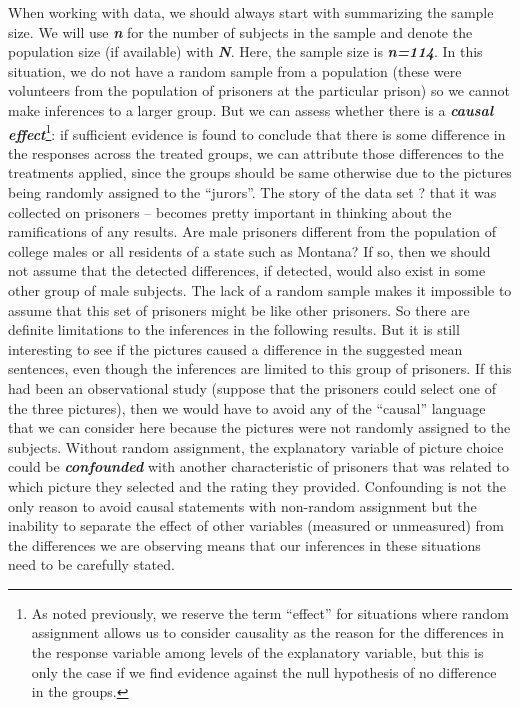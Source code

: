 \documentclass[]{book}
\let\rmarkdownfootnote\footnote%
\def\footnote{\protect\rmarkdownfootnote}
\begin{document}
When working with data, we should always start with summarizing the
sample size. We will use \textbf{\emph{n}} for the number of subjects in
the sample and denote the population size (if available) with
\textbf{\emph{N}}. Here, the sample size is \textbf{\emph{n=114}}. In
this situation, we do not have a random sample from a population (these
were volunteers from the population of prisoners at the particular
prison) so we cannot make inferences to a larger group. But we can
assess whether there is a \textbf{\emph{causal effect}}\footnote{As
  noted previously, we reserve the term ``effect'' for situations where
  random assignment allows us to consider causality as the reason for
  the differences in the response variable among levels of the
  explanatory variable, but this is only the case if we find evidence
  against the null hypothesis of no difference in the groups.}: if
sufficient evidence is found to conclude that there is some difference
in the responses across the treated groups, we can attribute those
differences to the treatments applied, since the groups should be same
otherwise due to the pictures being randomly assigned to the ``jurors''.
The story of the data set ? that it was collected on prisoners --
becomes pretty important in thinking about the ramifications of any
results. Are male prisoners different from the population of college
males or all residents of a state such as Montana? If so, then we should
not assume that the detected differences, if detected, would also exist
in some other group of male subjects. The lack of a random sample makes
it impossible to assume that this set of prisoners might be like other
prisoners. So there are definite limitations to the inferences in the
following results. But it is still interesting to see if the pictures
caused a difference in the suggested mean sentences, even though the
inferences are limited to this group of prisoners. If this had been an
observational study (suppose that the prisoners could select one of the
three pictures), then we would have to avoid any of the ``causal''
language that we can consider here because the pictures were not
randomly assigned to the subjects. Without random assignment, the
explanatory variable of picture choice could be
\textbf{\emph{confounded}} with another characteristic of prisoners that
was related to which picture they selected and the rating they provided.
Confounding is not the only reason to avoid causal statements with
non-random assignment but the inability to separate the effect of other
variables (measured or unmeasured) from the differences we are observing
means that our inferences in these situations need to be carefully
stated.
\end{document}
